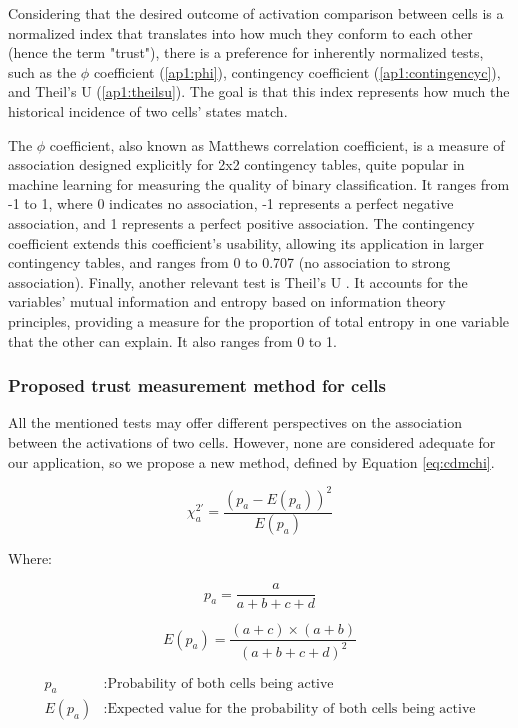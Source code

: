 Considering that the desired outcome of activation comparison between cells is a normalized index that translates into how much they conform to each other (hence the term "trust"), there is a preference for inherently normalized tests, such as the $\phi$ coefficient (\ref{ap1:phi}), contingency coefficient (\ref{ap1:contingencyc}), and Theil's U (\ref{ap1:theilsu}). The goal is that this index represents how much the historical incidence of two cells' states match.

The $\phi$ coefficient, also known as Matthews correlation coefficient, is a measure of association designed explicitly for 2x2 contingency tables, quite popular in machine learning for measuring the quality of binary classification. It ranges from -1 to 1, where 0 indicates no association, -1 represents a perfect negative association, and 1 represents a perfect positive association. The contingency coefficient extends this coefficient's usability, allowing its application in larger contingency tables, and ranges from 0 to 0.707 (no association to strong association).
Finally, another relevant test is Theil's U . It accounts for the variables' mutual information and entropy based on information theory principles, providing a measure for the proportion of total entropy in one variable that the other can explain. It also ranges from 0 to 1.

\subsubsection{Proposed trust measurement method for cells}

All the mentioned tests may offer different perspectives on the association between the activations of two cells. However, none are considered adequate for our application, so we propose a new method, defined by Equation \ref{eq:cdmchi}.

\begin{equation} \label{eq:cdmchi}
    \chi_a^{2'} = \frac{(p_a - E(p_a))^2}{E(p_a)}
\end{equation}

Where:

\[
    p_a = \frac{a}{a+b+c+d}
\]

\[
    E(p_a) = \frac{(a + c) \times (a + b)}{(a+b+c+d)^2}
\]

\begin{align*}
    p_a &: \text{Probability of both cells being active} \\
    E(p_a) &: \text{Expected value for the probability of both cells being active}
\end{align*}

